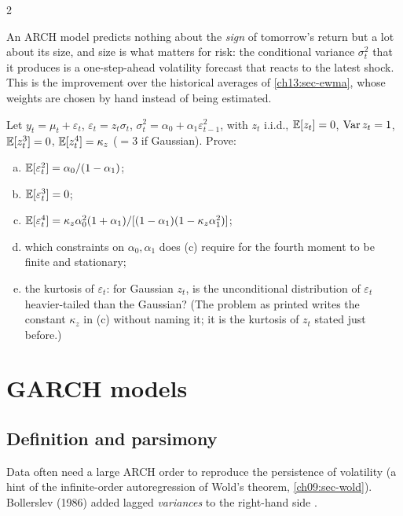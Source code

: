 \begin{paracol}{2}
\begin{finance}
An ARCH model predicts nothing about the \emph{sign} of tomorrow's return but a lot about its size, and size is what matters for risk: the conditional variance $\sigma_t^2$ that it produces is a one-step-ahead
volatility forecast that reacts to the latest shock. This is the improvement over the historical averages of \cref{ch13:sec-ewma}, whose weights are chosen by hand
instead of being estimated.
\end{finance}

\begin{exercise}\label{ch13:ex-ps5-3}
Let $y_t=\mu_t+\varepsilon_t$, $\varepsilon_t=z_t\sigma_t$, $\sigma_t^2=\alpha_0+\alpha_1\varepsilon_{t-1}^2$, with $z_t$ i.i.d., $\mathbb{E}[z_t]=0$, $\operatorname{Var} z_t=1$, $\mathbb{E}[z_t^3]=0$, $\mathbb{E}[z_t^4]=\kappa_z$ ($=3$ if Gaussian). Prove:
\begin{enumerate}[(a)]
  \item $\mathbb{E}[\varepsilon_t^2]=\alpha_0/(1-\alpha_1)$;
  \item $\mathbb{E}[\varepsilon_t^3]=0$;
  \item $\mathbb{E}[\varepsilon_t^4]=\kappa_z\alpha_0^2(1+\alpha_1)/[(1-\alpha_1)(1-\kappa_z\alpha_1^2)]$;
  \item which constraints on $\alpha_0,\alpha_1$ does (c) require for the fourth moment to be finite and stationary;
  \item the kurtosis of $\varepsilon_t$: for Gaussian $z_t$, is the unconditional distribution of $\varepsilon_t$ heavier-tailed than the Gaussian?
      (The problem as printed writes the constant $\kappa_z$ in (c) without naming it; it is the kurtosis of $z_t$ stated just before.)
\end{enumerate}
\end{exercise}


\section{GARCH models}\label{ch13:sec-garch}

\subsection{Definition and parsimony}\label{ch13:sec-garch-def}
Data often need a large ARCH order to reproduce the persistence of volatility (a hint of the infinite-order autoregression of Wold's theorem, \cref{ch09:sec-wold}). Bollerslev (1986)
added lagged \emph{variances} to the right-hand side .


\end{paracol}
